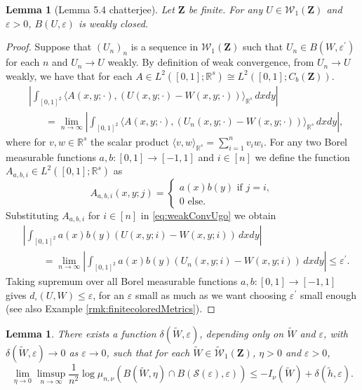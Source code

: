 \documentclass[12pt,twoside,a4paper]{article}
\newtheorem{lemma}[theorem]{Lemma}
\def\R{\mathbb{R}}
\newcommand{\Space}{\mathbf{Z}}
\newcommand{\CbFunct}{C_b(\Space)}
\newcommand{\Graphon}{\mathcal{W}_1}
\newcommand{\UGraphon}{\widetilde{\mathcal{W}}_1}
\begin{document}
\begin{lemma}[Lemma 5.4 chatterjee]\label{lem:weaklyclosedness}
Let $\Space$ be finite. For any $U \in \Graphon(\Space)$ and $\varepsilon > 0$, $B(U, \varepsilon)$ is weakly closed.
\end{lemma}
\begin{proof}
Suppose that $(U_n)_{n}$ is a sequence in $\Graphon(\Space)$ such that $U_n \in B(W, \varepsilon^{\prime})$ for each $n$ and $U_n \to U$ weakly.  By definition of weak convergence, from $U_n \to U$ weakly, we have that for each $A\in L^2([0,1];\R^s)\cong L^2([0,1];\CbFunct).$
\begin{equation}\label{eq:weakConvUgo}\begin{aligned}
     &\left| \int_{[0,1]^2} \langle A(x,y;\cdot),(U(x,y;\cdot) - W(x,y;\cdot))\rangle_{\R^s} \, dx dy \right|
\\& \hspace{20pt}= \lim_{n \to \infty} \left| \int_{[0,1]^2} \langle A(x,y;\cdot),(U_n(x,y;\cdot) - W(x,y;\cdot))\rangle_{\R^s} \, dx dy \right|,
\end{aligned}
   \end{equation}
where for $v,w\in \R^s$ the scalar product $\langle v,w \rangle_{\R^s}=\sum^n_{i=1}v_iw_i.$  For  any two Borel measurable functions $a, b : [0,1] \to [-1,1]$ and $i\in [n]$ we define the function $A_{a,b,i}\in L^2([0,1];\R^s)$ as
$$A_{a,b,i}(x,y;j)=\begin{cases}
    a(x)b(y) \text{ if } j=i,\\
    0 \text{ else}.
\end{cases}$$
Substituting $A_{a,b,i}$  for $i\in [n]$ in \eqref{eq:weakConvUgo} we obtain
\[
\begin{split}
    &\left| \int_{[0,1]^2} a(x) b(y)(U(x,y;i) - W(x,y;i)) \, dx dy \right|\\
 &\qquad=\lim_{n \to \infty} \left| \int_{[0,1]^2} a(x) b(y)(U_n(x,y;i) - W(x,y;i)) \, dx dy \right| \leq \varepsilon^{\prime}.
\end{split}
\]
Taking supremum over all Borel measurable functions $a, b : [0,1] \to [-1,1]$ gives $d_\square(U, W) \leq \varepsilon$, for an $\varepsilon$ small as much as we want choosing $\varepsilon^{\prime}$ small enough (see also Example \ref{rmk:finitecoloredMetrics}).
\end{proof}

\begin{lemma}\label{lem:upperbndinequalities}
There exists a function $\delta(\widetilde{W}, \varepsilon)$, depending only on $\widetilde{W}$ and $\varepsilon$, with $\delta(\widetilde{W}, \varepsilon) \to 0$ as $\varepsilon \to 0$, such that for each $\widetilde{W} \in \UGraphon(\Space)$, $\eta > 0$ and $\varepsilon > 0$,
\[
\lim_{\eta \to 0} \limsup_{n \to \infty} \frac{1}{n^2} \log \mu_{n,\nu}(B(\widetilde{W}, \eta) \cap B(\mathcal{S}(\varepsilon), \varepsilon)) \leq - I_{\nu}(\widetilde{W}) + \delta(\widetilde{h}, \varepsilon).
\]
\end{lemma}
\end{document}
